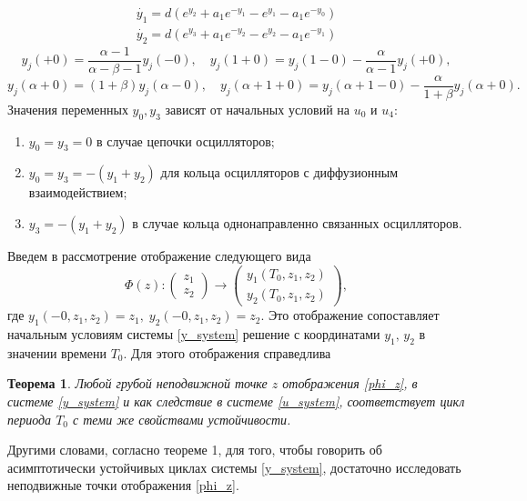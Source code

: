 \documentclass[12pt]{extarticle}
\begin{document}
\begin{equation}\label{y_system}
\begin{array}{l}
\dot{y_1} = d(e^{y_2} + a_1e^{-y_1} - e^{y_1} - a_1e^{-y_0}) \\
\dot{y_2} = d(e^{y_3} + a_1e^{-y_2} - e^{y_2} - a_1e^{-y_1})
\end{array}
\end{equation}
$$ y_j(+0) = \frac{\alpha -1}{\alpha - \beta - 1}y_j(-0), \quad y_j(1+0) = y_j(1-0) - \frac{\alpha}{\alpha - 1}y_j(+0), $$
$$ y_j(\alpha + 0) = (1 + \beta)y_j(\alpha - 0), \quad y_j(\alpha + 1 + 0) = y_j(\alpha + 1 - 0) - \frac{\alpha}{1 + \beta}y_j(\alpha + 0). $$
Значения переменных $ y_0, y_3 $ зависят от начальных условий на $ u_0 $ и $ u_4 $: 
\begin{enumerate}[label=\arabic*),leftmargin=1.5\parindent]
\item $ y_0 = y_3 = 0 $ в случае цепочки осцилляторов;
\item $ y_0 = y_3 = -(y_1 + y_2) $ для кольца осцилляторов с диффузионным взаимодействием;
\item $ y_3 = -(y_1 + y_2) $ в случае кольца однонаправленно связанных осцилляторов.
\end{enumerate}
Введем в рассмотрение отображение следующего вида
\begin{equation}\label{phi_z} 
	\Phi(z): \begin{pmatrix}
           z_1 \\
           z_2
          \end{pmatrix}
					\to
					\begin{pmatrix}
           y_1(T_0, z_1, z_2) \\
           y_2(T_0, z_1, z_2)
          \end{pmatrix},
\end{equation}
где $ y_1(-0, z_1, z_2) = z_1, \; y_2(-0, z_1, z_2) = z_2 $. Это отображение сопоставляет начальным условиям системы \eqref{y_system} решение с координатами $ y_1, \, y_2 $ в значении времени $ T_0 $. Для этого отображения справедлива

\newtheorem{theorem}{Теорема} 
\begin{theorem}
Любой грубой неподвижной точке $ z $ отображения \eqref{phi_z}, в системе \eqref{y_system} и как следствие в системе \eqref{u_system}, соответствует цикл периода $ T_0 $ с теми же свойствами устойчивости.
\end{theorem} 

\noindent Другими словами, согласно теореме 1, для того, чтобы говорить об асимптотически устойчивых циклах системы \eqref{y_system}, достаточно исследовать неподвижные точки отображения \eqref{phi_z}.
\end{document}
